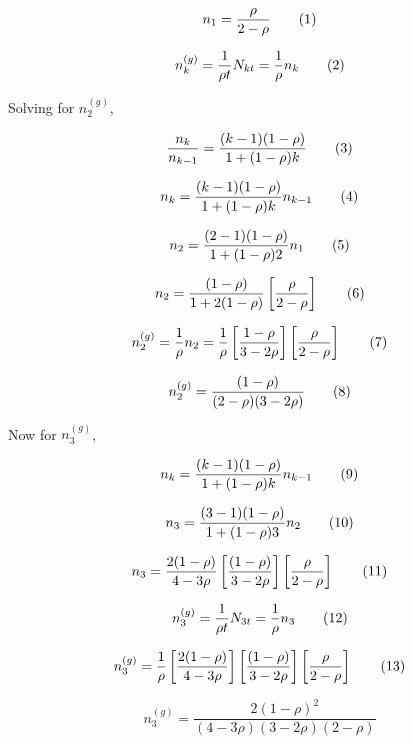 \[
  n_1
  =
  \frac{
    \rho
  }{
    2 - \rho
  }
  \addtag
\]

\[
  n_k^{(g)}
  =
  \frac{1}{\rho t}
  N_{k t}
  =
  \frac{1}{\rho}
  n_k
  \addtag
\]

Solving for $n_2^{(g)}$,

\[
  \frac{
    n_k
  }{
    n_{k-1}
  }
  =
  \frac{
    (k - 1)(1 - \rho)
  }{
    1 + (1 - \rho)k
  }
  \addtag
\]

\[
  n_k
  =
  \frac{
    (k - 1)(1 - \rho)
  }{
    1 + (1 - \rho)k
  }
  n_{k-1}
  \addtag
\]

\[
  n_2
  =
  \frac{
    (2 - 1)(1 - \rho)
  }{
    1 + (1 - \rho)2
  }
  n_1
  \addtag
\]

\[
  n_2
  =
  \frac{
    (1 - \rho)
  }{
    1 + 2(1 - \rho)
  }
  \left[
    \frac{
      \rho
    }{
      2 - \rho
    }
    \right]
  \addtag
\]

\[
  n_2^{(g)}
  =
  \frac{1}{\rho}
  n_2
  =
  \frac{1}{\rho}
  \left[
    \frac{
      1 - \rho
    }{
      3 - 2\rho
    }
  \right]
  \left[
    \frac{
      \rho
    }{
      2 - \rho
    }
  \right]
  \addtag
\]

\[
  n_2^{(g)}
  =
  \frac{
    (1 - \rho)
  }{
    (2 - \rho)
    (3 - 2\rho)
  }
  \addtag
\]

Now for $n_3^{(g)}$,

\[
  n_k
  =
  \frac{
    (k - 1)(1 - \rho)
  }{
    1 + (1 - \rho)k
  }
  n_{k-1}
  \addtag
\]

\[
  n_3
  =
  \frac{
    (3 - 1)(1 - \rho)
  }{
    1 + (1 - \rho)3
  }
  n_{2}
  \addtag
\]

\[
  n_3
  =
  \frac{
    2(1 - \rho)
  }{
    4 - 3\rho
  }
  \left[
    \frac{
    (1 - \rho)
  }{
    3 - 2\rho
  }
  \right]
  \left[
    \frac{
      \rho
    }{
      2 - \rho
    }
  \right]
  \addtag
\]

\[
  n_3^{(g)}
  =
  \frac{1}{\rho t}
  N_{3 t}
  =
  \frac{1}{\rho}
  n_3
  \addtag
\]

\[
  n_3^{(g)}
  =
  \frac{1}{\rho}
  \left[
    \frac{
      2(1 - \rho)
    }{
      4 - 3\rho
    }
  \right]
  \left[
    \frac{
    (1 - \rho)
  }{
    3 - 2\rho
  }
  \right]
  \left[
    \frac{
      \rho
    }{
      2 - \rho
    }
  \right]
  \addtag
\]

\[
  n_3^{(g)}
  =
  \frac{
    2 (1 - \rho)^2
  }{
    (4 - 3\rho)
    (3 - 2\rho)
    (2 - \rho)
  }
\]